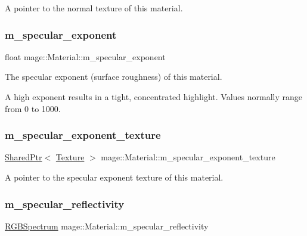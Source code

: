 A pointer to the normal texture of this material. \hypertarget{structmage_1_1_material_a62a9e8d9f90bf569b9f692c28da6a7dc}{}\label{structmage_1_1_material_a62a9e8d9f90bf569b9f692c28da6a7dc} 
\subsubsection{\texorpdfstring{m\+\_\+specular\+\_\+exponent}{m\_specular\_exponent}}
{\footnotesize\ttfamily float mage\+::\+Material\+::m\+\_\+specular\+\_\+exponent}

The specular exponent (surface roughness) of this material.

A high exponent results in a tight, concentrated highlight. Values normally range from 0 to 1000. \hypertarget{structmage_1_1_material_a452a92691f612bd21857525c00c5e8e5}{}\label{structmage_1_1_material_a452a92691f612bd21857525c00c5e8e5} 
\subsubsection{\texorpdfstring{m\+\_\+specular\+\_\+exponent\+\_\+texture}{m\_specular\_exponent\_texture}}
{\footnotesize\ttfamily \hyperlink{namespacemage_a1e01ae66713838a7a67d30e44c67703e}{Shared\+Ptr}$<$ \hyperlink{classmage_1_1_texture}{Texture} $>$ mage\+::\+Material\+::m\+\_\+specular\+\_\+exponent\+\_\+texture}

A pointer to the specular exponent texture of this material. \hypertarget{structmage_1_1_material_a45587388f4ff57c209de2280b71af9d3}{}\label{structmage_1_1_material_a45587388f4ff57c209de2280b71af9d3} 
\subsubsection{\texorpdfstring{m\+\_\+specular\+\_\+reflectivity}{m\_specular\_reflectivity}}
{\footnotesize\ttfamily \hyperlink{structmage_1_1_r_g_b_spectrum}{R\+G\+B\+Spectrum} mage\+::\+Material\+::m\+\_\+specular\+\_\+reflectivity}

